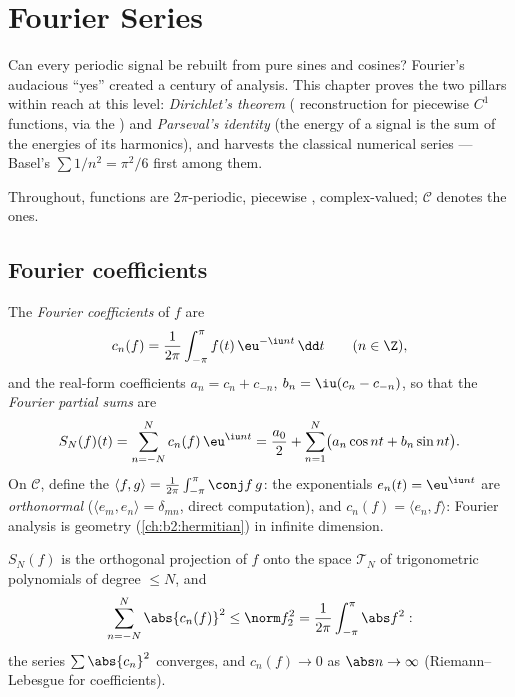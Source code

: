 \chapter{Fourier Series}\label{ch:b2:fourier}

Can every periodic signal be rebuilt from pure sines and cosines?
Fourier's audacious ``yes'' created a century of analysis. This
chapter proves the two pillars within reach at this level:
\emph{Dirichlet's theorem} ( reconstruction for piecewise $C^1$ functions,
via the ) and \emph{Parseval's identity} (the energy
of a signal is the sum of the energies of its harmonics), and
harvests the classical numerical series --- Basel's $\sum 1/n^2 =
\pi^2/6$ first among them.

Throughout, functions are $2\pi$-periodic, piecewise ,
complex-valued; $\mathcal{C}$ denotes the  ones.

\section{Fourier coefficients}

\begin{definition}\label{def:b2:fourier:coefficients}
The \emph{Fourier coefficients} of $f$
are
\[
c_n(f) = \frac{1}{2\pi}\int_{-\pi}^{\pi} f(t)\,\eu^{-\iu n t}\,\dd
t \qquad (n \in \Z),
\]
and the real-form coefficients $a_n = c_n + c_{-n}$, $b_n = \iu(c_n
- c_{-n})$, so that the \emph{Fourier partial sums} are
\[
S_N(f)(t) = \sum_{n=-N}^{N} c_n(f)\,\eu^{\iu nt}
= \frac{a_0}{2} + \sum_{n=1}^{N}\bigl(a_n\cos nt + b_n \sin
nt\bigr).
\]
On $\mathcal{C}$, define the  $\langle f,
g\rangle = \frac{1}{2\pi}\int_{-\pi}^{\pi}\conj f\,g$: the
exponentials $e_n(t) = \eu^{\iu nt}$ are \emph{orthonormal}
($\langle e_m, e_n\rangle = \delta_{mn}$, direct computation), and
$c_n(f) = \langle e_n, f\rangle$: Fourier analysis is 
geometry (\cref{ch:b2:hermitian}) in infinite dimension.
\end{definition}

\begin{proposition}\label{prop:b2:fourier:bessel}
$S_N(f)$ is the orthogonal projection of $f$ onto the space
$\mathcal{T}_N$ of trigonometric polynomials of degree $\leq N$,
and
\[
\sum_{n=-N}^{N} \abs{c_n(f)}^2 \leq \norm f_2^2 =
\frac{1}{2\pi}\int_{-\pi}^{\pi} \abs f^2 :
\]
the series $\sum \abs{c_n}^2$ converges, and $c_n(f) \to 0$ as
$\abs n \to \infty$ (Riemann--Lebesgue for coefficients).
\end{proposition}


